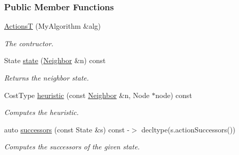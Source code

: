 \subsubsection*{Public Member Functions}
\begin{DoxyCompactItemize}
\item 
\hyperlink{structslb_1_1ext_1_1policy_1_1generator_1_1ActionsT_a97a7c0421ba9ffe63a6790d46bd85c8d}{ActionsT} (My\+Algorithm \&alg)
\begin{DoxyCompactList}\small\item\em The contructor. \end{DoxyCompactList}\item 
State \hyperlink{structslb_1_1ext_1_1policy_1_1generator_1_1ActionsT_a85db41225282eb0fab196a7df5fb25e7}{state} (\hyperlink{structslb_1_1ext_1_1policy_1_1generator_1_1ActionsT_a579c1e623b0e091ad02ab78edb271810}{Neighbor} \&n) const 
\begin{DoxyCompactList}\small\item\em Returns the neighbor state. \end{DoxyCompactList}\item 
Cost\+Type \hyperlink{structslb_1_1ext_1_1policy_1_1generator_1_1ActionsT_af3ce8c0f1dd2b233fc0873a1757c17c9}{heuristic} (const \hyperlink{structslb_1_1ext_1_1policy_1_1generator_1_1ActionsT_a579c1e623b0e091ad02ab78edb271810}{Neighbor} \&n, Node $\ast$node) const 
\begin{DoxyCompactList}\small\item\em Computes the heuristic. \end{DoxyCompactList}\item 
auto \hyperlink{structslb_1_1ext_1_1policy_1_1generator_1_1ActionsT_a8166cc83070e2228ee92c74f59de4b4c}{successors} (const State \&s) const -\/$>$ decltype(s.\+action\+Successors())
\begin{DoxyCompactList}\small\item\em Computes the successors of the given state. \end{DoxyCompactList}\end{DoxyCompactItemize}
